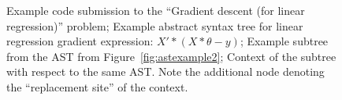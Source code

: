 \begin{figure}[t!]
\center
{}

\caption[Example subtree]{
 Example code submission to the ``Gradient descent (for linear regression)'' problem;
 Example abstract syntax tree for linear regression gradient expression: $X'*(X*\theta - y)$;
 Example subtree from the AST from Figure~\ref{fig:astexample2};  
Context of the subtree with respect to the same AST.  Note the additional node denoting the ``replacement site'' of the context.
}
\end{figure}



